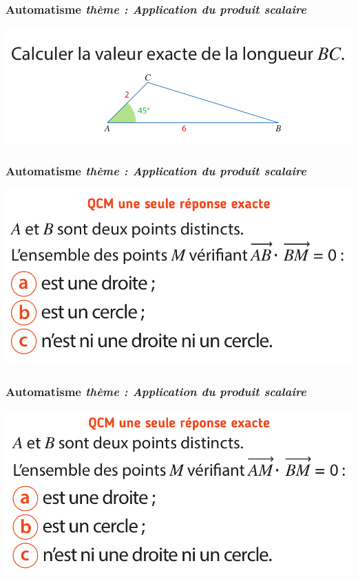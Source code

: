 \documentclass[11pt]{beamer}
\newcounter{autocompteur}
\newcommand{\automatisme}[1]{\addtocounter{autocompteur}{1}\frametitle{Automatisme  \theautocompteur  \textit{ thème : #1}}}
\begin{document}
\begin{frame}
\automatisme{Application du produit scalaire}

\begin{center}
\includegraphics[scale=0.3]{ressources/prodscal-6.png}
\end{center}


\end{frame}


\begin{frame}
\automatisme{Application du produit scalaire}

\begin{center}
\includegraphics[scale=0.3]{ressources/prodscal-7.png}
\end{center}


\end{frame}



\begin{frame}
\automatisme{Application du produit scalaire}

\begin{center}
\includegraphics[scale=0.3]{ressources/prodscal-8.png}
\end{center}


\end{frame}
\end{document}
